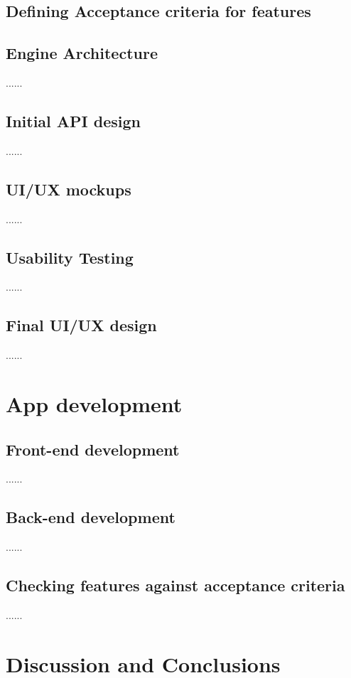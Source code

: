 \documentclass[UTF8,a4paper,12pt]{ctexart}
\numberwithin{equation}{section}
\begin{document}
\subsection{Defining Acceptance criteria for features}

\subsection{Engine Architecture}
......
\subsection{Initial API design}
......
\subsection{UI/UX mockups}
......
\subsection{Usability Testing}
......
\subsection{Final UI/UX design}
......

\newpage
{}
\section{App development}

\subsection{Front-end development}
......

\subsection{Back-end development}
......

\subsection{Checking features against acceptance criteria}
......

\newpage
{}
\section{Discussion and Conclusions}
\end{document}
